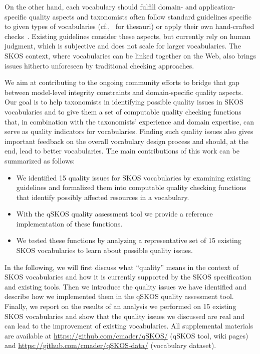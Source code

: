 On the other hand, each vocabulary should fulfill domain- and application-specific quality aspects and taxonomists often follow standard guidelines specific to given types of vocabularies (cf.,~\cite{ISO25964-1:2011,Z39.19:2005} for thesauri) or apply their own hand-crafted checks~\cite{Coronado2009}. Existing guidelines consider these aspects, but currently rely on human judgment, which is subjective and does not scale for larger vocabularies. The SKOS context, where vocabularies can be linked together on the Web, also brings issues hitherto unforeseen by traditional checking approaches.



We aim at contributing to the ongoing community efforts to bridge that gap between model-level integrity constraints and domain-specific quality aspects. Our goal is to help taxonomists in identifying possible quality issues in SKOS vocabularies and to give them a set of computable quality checking functions that, in combination with the taxonomists' experience and domain expertise, can serve as quality indicators for vocabularies. Finding such quality issues also gives important feedback on the overall vocabulary design process and should, at the end, lead to better vocabularies. The main contributions of this work can be summarized as follows:

\begin{itemize}

	\item We identified 15 quality issues for SKOS vocabularies by examining existing guidelines and formalized them into computable quality checking functions that identify possibly affected resources in a vocabulary.
	
	\item With the qSKOS quality assessment tool we provide a reference implementation of these functions.

	\item We tested these functions by analyzing a representative set of 15 existing SKOS vocabularies to learn about possible quality issues.

\end{itemize}


In the following, we will first discuss what ``quality'' means in the context of SKOS vocabularies and how it is currently supported by the SKOS specification and existing tools. Then we introduce the quality issues we have identified and describe how we implemented them in the qSKOS quality assessment tool. Finally, we report on the results of an analysis we performed on 15 existing SKOS vocabularies and show that the quality issues we discussed are real and can lead to the improvement of existing vocabularies. All supplemental materials are available at \url{https://github.com/cmader/qSKOS/} (qSKOS tool, wiki pages) and \url{https://github.com/cmader/qSKOS-data/} (vocabulary dataset).
